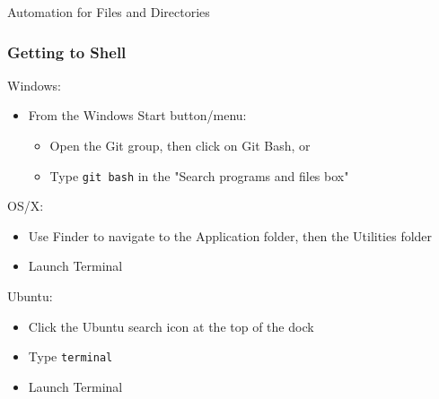 \documentclass{beamer}
\begin{document}
\begin{frame}
  \begin{block}{Automation for Files and Directories}
  \end{block}
\end{frame}


\begin{frame}
  \frametitle{Getting to Shell}
  Windows:
  \begin{itemize}
    \item From the Windows Start button/menu:
    \begin{itemize}
      \item Open the Git group, then click on Git Bash, or
      \item Type {\tt git bash} in the "Search programs and files box"
    \end{itemize}
  \end{itemize}

  OS/X:
  \begin{itemize}
    \item Use Finder to navigate to the Application folder, then the Utilities folder
    \item Launch Terminal
  \end{itemize}

  Ubuntu:
  \begin{itemize}
    \item Click the Ubuntu search icon at the top of the dock
    \item Type {\tt terminal}
    \item Launch Terminal
  \end{itemize}

\end{frame}
\end{document}
